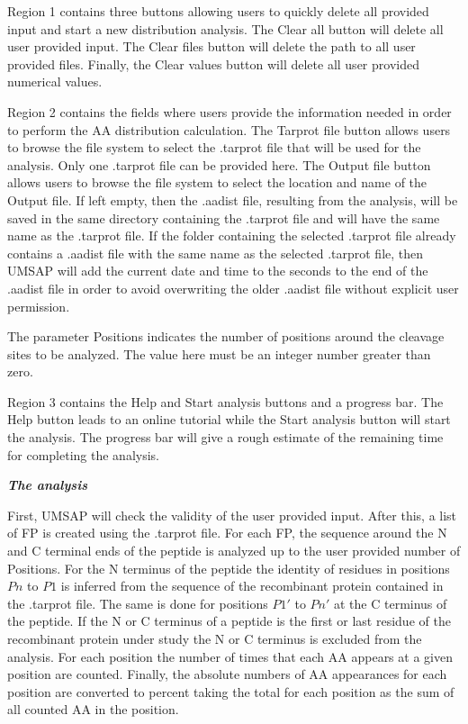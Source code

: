 Region \num{1} contains three buttons allowing users to quickly delete all provided input and start a new distribution analysis. The Clear all button will delete all user provided input. The Clear files button will delete the path to all user provided files. Finally, the Clear values button will delete all user provided numerical values.

Region \num{2} contains the fields where users provide the information needed in order to perform the AA distribution calculation. The Tarprot file button allows users to browse the file system to select the .tarprot file that will be used for the analysis. Only one .tarprot file can be provided here. The Output file button allows users to browse the file system to select the location and name of the Output file. If left empty, then the .aadist file, resulting from the analysis, will be saved in the same directory containing the .tarprot file and will have the same name as the .tarprot file. If the folder containing the selected .tarprot file already contains a .aadist file with the same name as the selected .tarprot file, then UMSAP will add the current date and time to the seconds to the end of the .aadist file in order to avoid overwriting the older .aadist file without explicit user permission.    

The parameter Positions indicates the number of positions around the cleavage sites to be analyzed. The value here must be an integer number greater than zero.

Region \num{3} contains the Help and Start analysis buttons and a progress bar. The Help button leads to an online tutorial while the Start analysis button will start the analysis. The progress bar will give a rough estimate of the remaining time for completing the analysis.

\textit{\textbf{The analysis}}

First, UMSAP will check the validity of the user provided input. After this, a list of FP is created using the .tarprot file. For each FP, the sequence around the N and C terminal ends of the peptide is analyzed up to the user provided number of Positions. For the N terminus of the peptide the identity of residues in positions \(Pn\) to \(P1\) is inferred from the sequence of the recombinant protein contained in the .tarprot file. The same is done for positions \(P1'\) to \(Pn'\) at the C terminus of the peptide. If the N or C terminus of a peptide is the first or last residue of the recombinant protein under study the N or C terminus is excluded from the analysis. For each position the number of times that each AA appears at a given position are counted. Finally, the absolute numbers of AA appearances for each position are converted to percent taking the total for each position as the sum of all counted AA in the position.

